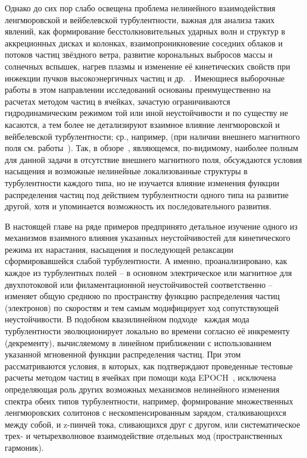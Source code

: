 Однако до сих пор слабо освещена проблема нелинейного взаимодействия ленгмюровской и вейбелевской турбулентности, важная для анализа таких явлений, как формирование бесстолкновительных ударных волн и структур в аккреционных дисках и колонках, взаимопроникновение соседних облаков и потоков частиц звёздного ветра, развитие корональных выбросов массы и солнечных вспышек, нагрев плазмы и изменение её кинетических свойств при инжекции пучков высокоэнергичных частиц и др.~\cite{Robinson1993,Lui1993,Aschwanden2005,Medvedev2006,Kato2007,Karlick2008,Nishikawa2009,Treumann2015,Marcowith2016,Zhou2022,Zhang2023,Kuznetsov2025,Mehlhaff2026}. Имеющиеся выборочные работы в этом направлении исследований основаны преимущественно на расчетах методом частиц в ячейках, зачастую ограничиваются гидродинамическим режимом той или иной неустойчивости и по существу не касаются, а тем более не детализируют взаимное влияние ленгмюровской и вейбелевской турбулентности; ср., например,\cite{Kong2009,Bret2010,Ruyer2015,Moya2022,Lazar2023,Zhang2023} (при наличии внешнего магнитного поля см. работы~\cite{Lazar2023,Lopez2020}). Так, в обзоре~\cite{Bret2010}, являющемся, по-видимому, наиболее полным для данной задачи в отсутствие внешнего магнитного поля, обсуждаются условия насыщения и возможные нелинейные локализованные структуры в турбулентности каждого типа, но не изучается влияние изменения функции распределения частиц под действием турбулентности одного типа на развитие другой, хотя и упоминается возможность их последовательного развития.

В настоящей главе на ряде примеров предпринято детальное изучение одного из механизмов взаимного влияния указанных неустойчивостей для кинетического режима их нарастания, насыщения и последующей релаксации сформировавшейся слабой турбулентности. А именно, проанализировано, как каждое из турбулентных полей -- в основном электрическое или магнитное для двухпотоковой или филаментационной неустойчивостей соответственно -- изменяет общую среднюю по пространству функцию распределения частиц (электронов) по скоростям и тем самым модифицирует ход сопутствующей неустойчивости. В подобном квазилинейном подходе~\cite{Davidson1972,VedenovRyutov1975,Appert1976,GaleevSagdeev1984,Lui1993,Sadovskii2001,Webb2001,Pokhotelov2011,Ruyer2015,StockemNovo2015,Bakunin2017,Kuznetsov2022,Kuznetsov2023} каждая мода турбулентности эволюционирует локально во времени согласно её инкременту (декременту), вычисляемому в линейном приближении с использованием указанной мгновенной функции распределения частиц. При этом рассматриваются условия, в которых, как подтверждают проведенные тестовые расчеты методом частиц в ячейках при помощи кода EPOCH~\cite{Arber2015}, исключена определяющая роль других возможных механизмов нелинейного изменения спектра обеих типов турбулентности, например, формирование множественных ленгмюровских солитонов с нескомпенсированным зарядом, сталкивающихся между собой, и z-пинчей тока, сливающихся друг с другом, или систематическое трех- и четырехволновое взаимодействие отдельных мод (пространственных гармоник).

